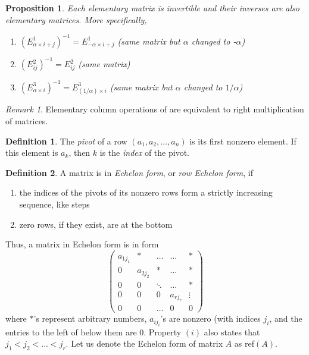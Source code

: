 \documentclass{article}
\newtheorem{proposition}[theorem]{Proposition}
\theoremstyle{remark}
\newtheorem*{remark}{Remark}
\theoremstyle{definition}
\newtheorem{definition}{Definition}[section]
\begin{document}
\begin{proposition}
Each elementary matrix is invertible and their inverses are also elementary matrices. More specifically, 
\begin{enumerate}
    \item $(E^1_{\alpha \times i + j})^{-1} = E^1_{-\alpha \times i + j}$ (same matrix but $\alpha$ changed to -$\alpha$)
    \item $(E^2_{i j})^{-1} = E^2_{i j}$ (same matrix) 
    \item $(E^3_{\alpha \times i})^{-1} = E^{3}_{(1/\alpha) \times i}$ (same matrix but $\alpha$ changed to $1 / \alpha$)
\end{enumerate}
\end{proposition}

\begin{remark}
Elementary column operations of are equivalent to right multiplication of matrices. 
\end{remark}

\begin{definition}
The \textit{pivot} of a row $(a_1, a_2, ..., a_n)$ is its first nonzero element. If this element is $a_k$, then $k$ is the \textit{index} of the pivot. 
\end{definition}

\begin{definition}
A matrix is in \textit{Echelon form}, or \textit{row Echelon form}, if 
\begin{enumerate}
    \item the indices of the pivots of its nonzero rows form a strictly increasing sequence, like steps
    \item zero rows, if they exist, are at the bottom
\end{enumerate}
Thus, a matrix in Echelon form is in form
\[\begin{pmatrix}
a_{1 j_1} & * & \ldots & \ldots & * \\
0 & a_{2 j_2} & * & \ldots & * \\
0& 0& \ddots & \ldots & * \\
0& 0& 0& a_{r j_r} & \vdots \\
0 & 0 & \ldots & 0 & 0
\end{pmatrix}\]
where $*$'s represent arbitrary numbers, $a_{i j_i}$'s are nonzero (with indices $j_i$, and the entries to the left of below them are $0$. Property $(i)$ also states that $j_1 < j_2 < ... < j_r$. Let us denote the Echelon form of matrix $A$ as ref$(A)$. 
\end{definition}
\end{document}
